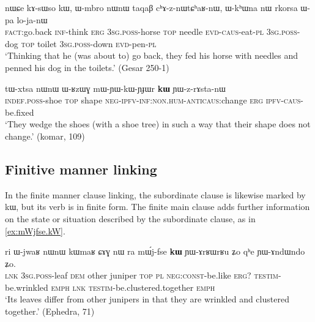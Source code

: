 \documentclass[oldfontcommands,oneside,a4paper,11pt]{article}
\newcommand{\ipa}[1]{{\phon #1}} %
\begin{document}
  \begin{exe}
\ex \label{ex:nWCe.kAsWso}
\gll 
\ipa{nɯɕe}  	\ipa{kɤ-sɯso}  	\ipa{kɯ,}  	\ipa{ɯ-mbro}  	\ipa{nɯnɯ}  	\ipa{taqaβ}  	\ipa{cʰɤ-z-nɯtɕʰaʁ-nɯ,}  	\ipa{ɯ-kʰɯna}  	\ipa{nɯ}  	\ipa{rkorsa}  	\ipa{ɯ-pa}  	\ipa{lo-ja-nɯ}  \\
\textsc{fact}:go.back \textsc{inf}-think \textsc{erg} \textsc{3sg.poss}-horse \textsc{top} needle \textsc{evd-caus}-eat-\textsc{pl}   \textsc{3sg.poss}-dog \textsc{top} toilet \textsc{3sg.poss}-down \textsc{evd}-pen-\textsc{pl} \\
\glt `Thinking that he (was about to) go back, they fed his horse with needles and penned his dog in the toilets.' (Gesar 250-1)
 \end{exe} 
 
 

\begin{exe}
\ex \label{ex:mWYWkWYJWr}
\gll
\ipa{tɯ-xtsa}   	\ipa{nɯnɯ}   	\ipa{ɯ-ʁzɯɣ}   	\ipa{mɯ-ɲɯ-kɯ-ɲɟɯr}   	\ipa{\textbf{kɯ}}   	\ipa{ɲɯ-z-rɤsta-nɯ}   \\
\textsc{indef.poss}-shoe \textsc{top} shape \textsc{neg-ipfv-inf:non.hum-anticaus}:change \textsc{erg} \textsc{ipfv-caus}-be.fixed \\
\glt `They wedge the shoes (with a shoe tree)  in such a way that their shape does not change.' (komar, 109)
\end{exe}

\subsection{Finitive manner linking}
In the finite manner clause linking, the subordinate clause is likewise marked by \ipa{kɯ}, but its verb is in finite form. The  finite  main clause adds further information on the state or situation described by the subordinate clause, as in \ref{ex:mWjfse.kW}. 
 

 \begin{exe}
\ex \label{ex:mWjfse.kW}
\gll
\ipa{ri} 	\ipa{ɯ-jwaʁ} 	\ipa{nɯnɯ} 	\ipa{kɯmaʁ} 	\ipa{ɕɤɣ} 	\ipa{nɯ} \ipa{ra} 	\ipa{mɯ́j-fse} 	\ipa{\textbf{kɯ}} 	\ipa{ɲɯ-ɤrʁɯrʁu} 	\ipa{ʑo} 	\ipa{qʰe} 	\ipa{ɲɯ-ɤndɯndo} 	\ipa{ʑo.} \\
\textsc{lnk} \textsc{3sg.poss}-leaf \textsc{dem} other juniper \textsc{top} \textsc{pl} \textsc{neg:const}-be.like \textsc{erg?} \textsc{testim}-be.wrinkled \textsc{emph} \textsc{lnk}  \textsc{testim}-be.clustered.together \textsc{emph} \\
\glt `Its leaves differ from other junipers in that they are wrinkled and clustered together.' (Ephedra, 71)
 \end{exe}
 
\end{document}
